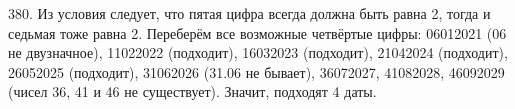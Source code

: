 380. Из условия следует, что пятая цифра всегда должна быть равна 2, тогда и седьмая тоже равна 2. Переберём все возможные четвёртые цифры: 06012021 (06 не двузначное), 11022022 (подходит), 16032023 (подходит), 21042024 (подходит), 26052025 (подходит), 31062026 (31.06 не бывает), 36072027, 41082028, 46092029 (чисел 36, 41 и 46 не существует). Значит, подходят 4 даты.\\
